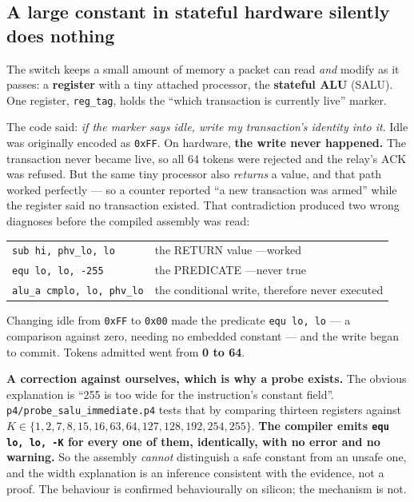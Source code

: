 \documentclass[10pt,a4paper,oneside]{article}
\newcommand{\code}[1]{\texttt{\small #1}}
\begin{document}
\subsection{A large constant in stateful hardware silently does nothing}

The switch keeps a small amount of memory a packet can read \emph{and} modify as it passes:
a \textbf{register} with a tiny attached processor, the \textbf{stateful ALU} (SALU). One
register, \code{reg\_tag}, holds the ``which transaction is currently live'' marker.

The code said: \emph{if the marker says idle, write my transaction's identity into it}.
Idle was originally encoded as \code{0xFF}. On hardware, \textbf{the write never happened.}
The transaction never became live, so all 64 tokens were rejected and the relay's ACK was
refused. But the same tiny processor also \emph{returns} a value, and that path worked
perfectly --- so a counter reported ``a new transaction was armed'' while the register said
no transaction existed. That contradiction produced two wrong diagnoses before the compiled
assembly was read:

\begin{center}\small
\begin{tabular}{@{}ll@{}}
\code{sub hi, phv\_lo, lo}      & the RETURN value \quad---\quad worked \\
\code{equ lo, lo, -255}         & the PREDICATE \quad---\quad never true \\
\code{alu\_a cmplo, lo, phv\_lo} & the conditional write, therefore never executed \\
\end{tabular}
\end{center}

Changing idle from \code{0xFF} to \code{0x00} made the predicate \code{equ lo, lo} --- a
comparison against zero, needing no embedded constant --- and the write began to commit.
Tokens admitted went from \textbf{0 to 64}.

\textbf{A correction against ourselves, which is why a probe exists.} The obvious
explanation is ``255 is too wide for the instruction's constant field''.
\code{p4/probe\_salu\_immediate.p4} tests that by comparing thirteen registers against
$K \in \{1,2,7,8,15,16,63,64,127,128,192,254,255\}$. \textbf{The compiler emits
\code{equ lo, lo, -K} for every one of them, identically, with no error and no warning.} So
the assembly \emph{cannot} distinguish a safe constant from an unsafe one, and the width
explanation is an inference consistent with the evidence, not a proof. The behaviour is
confirmed behaviourally on silicon; the mechanism is not.
\end{document}
